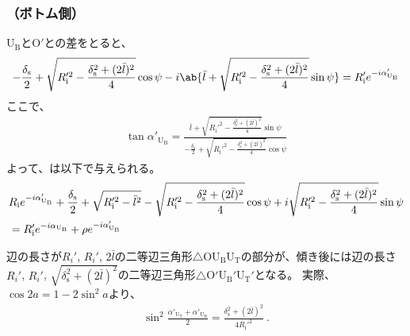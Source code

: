 \subsubsection{\AfterRotatePlateContactPoint（ボトム側）}
\AfterRotateBottomSideReceiverPlateCenter U$_\mathrm B$と\CurvatureCenter O$'$との差をとると、
\begin{align*}
  -\frac{\delta_\mathrm s}2+\sqrt{R_\mathrm i'^2-\frac{\delta_\mathrm s^2+(2\bar l)^2}4}\cos\psi
  -i\ab\{\bar l+\sqrt{R_\mathrm i'^2-\frac{\delta_\mathrm s^2+(2\bar l)^2}4}\sin\psi\}
  = R_\mathrm i'e^{-i\alpha'_{\mathrm U_\mathrm B}}
\end{align*}
ここで、
\begin{align*}
  \tan\alpha'_{\mathrm U_\mathrm B}
  = \frac{\displaystyle\bar l+\sqrt{R_\mathrm i'^2-\frac{\delta_\mathrm s^2+(2\bar l)^2}4}\sin\psi}
         {\displaystyle-\frac{\delta_\mathrm s}2+\sqrt{R_\mathrm i'^2-\frac{\delta_\mathrm s^2+(2\bar l)^2}4}\cos\psi}
\end{align*}
よって、\AfterRotatePlateContactPoint は以下で与えられる。
\begin{align}
  \notag
  &  R_\mathrm ie^{-i\alpha'_{\mathrm U_\mathrm B}}
     +\frac{\delta_\mathrm s}2+\sqrt{R_\mathrm i'^2-\bar l^2}-\sqrt{R_\mathrm i'^2-\frac{\delta_\mathrm s^2+(2\bar l)^2}4}\cos\psi
     +i\sqrt{R_\mathrm i'^2-\frac{\delta_\mathrm s^2+(2\bar l)^2}4}\sin\psi\\
  &= R_\mathrm i'e^{-i\alpha_{\mathrm U_\mathrm B}}+\rho e^{-i\alpha'_{\mathrm U_\mathrm B}}
   \label{eq:afterUBcontact}
\end{align}
\begin{hosoku}
辺の長さが$R_i'$, $R_i'$, $2\bar l$の二等辺三角形$\triangle$OU$_\mathrm B$U$_\mathrm T$の部分が、傾き後には辺の長さ$R_i'$, $R_i'$, $\sqrt{\delta_\mathrm s^2+(2\bar l)^2}$の二等辺三角形$\triangle$O$'$U$_\mathrm B'$U$_\mathrm T'$となる。
実際、$\cos2a = 1-2\sin^2\!a$より、
\begin{align*}
  \sin^2\frac{\alpha'_{\mathrm U_\mathrm T}+\alpha'_{\mathrm U_\mathrm B}}2
  = \frac{\delta_\mathrm s^2+(2\bar l)^2}{4R_\mathrm i'^2}\ .
\end{align*}
\end{hosoku}


